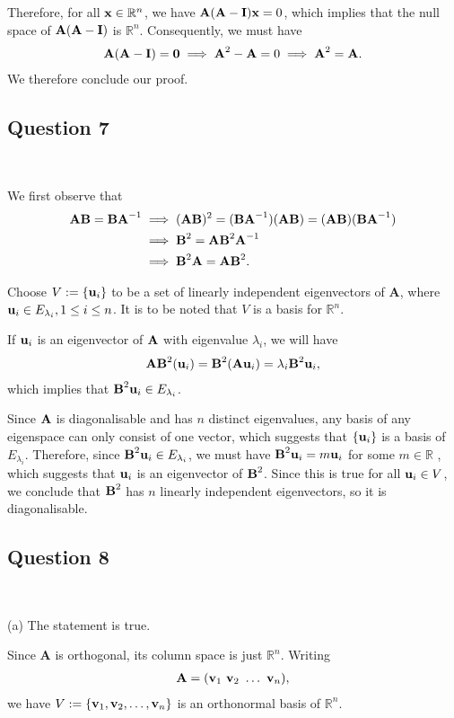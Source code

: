 \documentclass[12pt]{amsart}
\theoremstyle{plain}
\theoremstyle{definition}
\def\mb{\mathbb}
\def\bf{\textbf}
\newcommand{\RA}{\implies}
\begin{document}
Therefore, for all $\bf x\in\mb R^n$, we have $\bf A(\bf A-\bf I)\bf x=0$, which implies that the null space of $\bf A(\bf A-\bf I)$ is $\mb R^n$. Consequently, we must have
\begin{align*}
	\bf A(\bf A-\bf I)=\bf 0\RA \bf A^2-\bf A=0\RA \bf A^2=\bf A.
\end{align*}
We therefore conclude our proof.

\newpage
\subsection*{Question 7}\ 

We first observe that
\begin{align*}
	\bf A\bf B=\bf B\bf A^{-1}&\RA (\bf A\bf B)^2=(\bf B\bf A^{-1})(\bf A\bf B)=(\bf A\bf B)(\bf B\bf A^{-1})\\
	&\RA \bf B^2=\bf A\bf B^2\bf A^{-1}\\
	&\RA \bf B^2\bf A=\bf A\bf B^2.
\end{align*}

Choose $V:=\{\bf u_i\}$ to be a set of linearly independent eigenvectors of \bf A, where $\bf u_i\in E_{\lambda_i}, 1\leq i\leq n$. It is to be noted that $V$ is a basis for $\mb R^n$.

If $\bf u_i$ is an eigenvector of $\bf A$ with eigenvalue $\lambda_i$, we will have
\begin{align*}
	\bf A\bf B^2(\bf u_i)=\bf B^2(\bf A\bf u_i)=\lambda_i\bf B^2\bf u_i,
\end{align*}
which implies that $\bf B^2\bf u_i\in E_{\lambda_i}$.

Since $\bf A$ is diagonalisable and has $n$ distinct eigenvalues, any basis of any eigenspace can only consist of one vector, which suggests that $\{\bf u_i\}$ is a basis of $E_{\lambda_i}$. Therefore, since $\bf B^2\bf u_i\in E_{\lambda_i}$, we must have   $\bf B^2\bf u_i=m\bf u_i$ for some $m\in\mb R$ , which suggests that $\bf u_i$ is an eigenvector of $\bf B^2$. Since this is true for all $\bf u_i\in V$, we conclude that $\bf B^2$ has $n$ linearly independent eigenvectors, so it is diagonalisable.

\newpage
\subsection*{Question 8}\ 

(a) The statement is true.

Since \bf A is orthogonal, its column space is just $\mb R^n$. Writing
\begin{align*}
	\bf A=(\bf v_1\ \bf v_2\ \ldots\ \bf v_n),
\end{align*}
we have $V:=\{\bf v_1, \bf v_2,\ldots, \bf v_n\}$ is an orthonormal basis of $\mb R^n$.  
\end{document}
